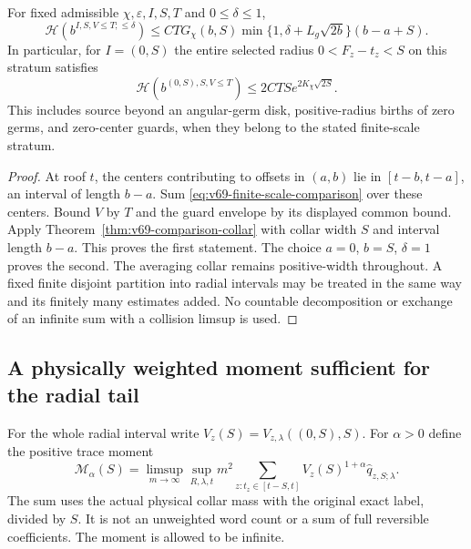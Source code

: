\begin{theorem}
\label{thm:v69-finite-scale-height}
For fixed admissible $\chi,\varepsilon,I,S,T$ and $0\le\delta\le1$,
\begin{equation}\label{eq:v69-finite-scale-height}
 \mathcal H(b^{I,S,V\le T;\le\delta})
 \le CTG_\chi(b,S)\min\{1,\delta+L_g\sqrt{2b}\}
                                      (b-a+S).
\end{equation}
In particular, for $I=(0,S)$ the entire selected radius
$0<F_z-t_z<S$ on this stratum satisfies
\begin{equation}\label{eq:v69-full-radius-height}
 \mathcal H(b^{(0,S),S,V\le T})
                    \le2CTS e^{2K_\chi\sqrt{2S}}.
\end{equation}
This includes source beyond an angular-germ disk, positive-radius
births of zero germs, and zero-center guards, when they belong to the
stated finite-scale stratum.
\end{theorem}
\begin{proof}
At roof $t$, the centers contributing to offsets in $(a,b)$ lie in
$[t-b,t-a]$, an interval of length $b-a$. Sum
\eqref{eq:v69-finite-scale-comparison} over these centers. Bound
$V$ by $T$ and the guard envelope by its displayed common bound.
Apply Theorem~\ref{thm:v69-comparison-collar} with collar width $S$
and interval length $b-a$. This proves the first statement. The
choice $a=0$, $b=S$, $\delta=1$ proves the second. The averaging
collar remains positive-width throughout. A fixed finite disjoint
partition into radial intervals may be treated in the same way and
its finitely many estimates added. No countable decomposition or
exchange of an infinite sum with a collision limsup is used.
\end{proof}

\subsection{A physically weighted moment sufficient for the radial tail}
For the whole radial interval write $V_z(S)=V_{z,\lambda}((0,S),S)$.
For $\alpha>0$ define the positive trace moment
\begin{equation}\label{eq:v69-radial-moment}
 \mathcal M_\alpha(S)=\limsup_{m\to\infty}\sup_{R,\lambda,t}m^2
 \sum_{z:t_z\in[t-S,t]} V_z(S)^{1+\alpha}
                                     \widehat q_{z,S;\lambda}.
\end{equation}
The sum uses the actual physical collar mass with the original exact
label, divided by $S$. It is not an unweighted word count or a sum
of full reversible coefficients. The moment is allowed to be infinite.

